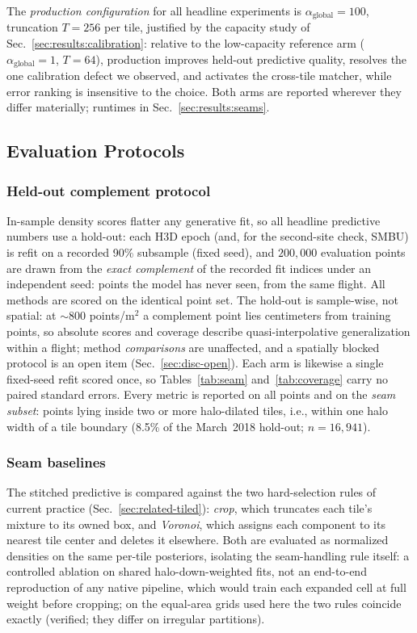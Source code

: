  The \emph{production configuration} for all headline experiments is
$\alpha_{\mathrm{global}}=100$, truncation $T=256$ per tile, justified
by the capacity study of Sec.~\ref{sec:results:calibration}:
relative to the low-capacity reference arm ($\alpha_{\mathrm{global}}=1$,
$T=64$), production improves held-out predictive quality, resolves
the one calibration defect we observed, and activates the cross-tile
matcher, while error ranking is insensitive to the choice. Both arms
are reported wherever they differ materially; runtimes in
Sec.~\ref{sec:results:seams}.

\subsection{Evaluation Protocols}
\label{sec:setup:protocols}

\subsubsection{Held-out complement protocol}
 In-sample density scores flatter any generative fit, so all headline
predictive numbers use a hold-out: each H3D epoch (and, for the
second-site check, SMBU) is refit on a
recorded 90\% subsample (fixed seed), and $200{,}000$ evaluation points
are drawn from the \emph{exact complement} of the recorded fit indices
under an independent seed: points the model has never seen, from the
same flight. All methods are scored on the identical point set.
The hold-out is sample-wise, not spatial: at ${\sim}800$
points/m$^2$ a complement point lies centimeters from training points,
so absolute scores and coverage describe quasi-interpolative
generalization within a flight; method \emph{comparisons} are
unaffected, and a spatially
blocked protocol is an open item (Sec.~\ref{sec:disc-open}). Each arm
is likewise a single fixed-seed refit scored once, so
Tables~\ref{tab:seam} and~\ref{tab:coverage} carry no paired
standard errors.
Every metric is reported on all points and on the \emph{seam subset}:
points lying inside two or more halo-dilated tiles, i.e., within one
halo width of a tile boundary (8.5\% of the March~2018 hold-out;
$n=16{,}941$).

\subsubsection{Seam baselines}
The stitched predictive is compared against the two hard-selection rules
of current practice (Sec.~\ref{sec:related-tiled}): \emph{crop}, which
truncates each tile's mixture to its owned box, and \emph{Voronoi},
which assigns each component to its nearest tile center and deletes it
elsewhere. Both are evaluated as normalized densities on the same
per-tile posteriors, isolating the seam-handling rule itself: a
controlled ablation on shared halo-down-weighted fits, not an
end-to-end reproduction of any native pipeline, which would train each
expanded cell at full weight before cropping; on the
equal-area grids used here the two rules coincide exactly (verified;
they differ on irregular partitions).

